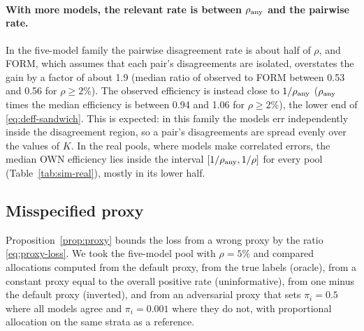 \paragraph{With more models, the relevant rate is between $\rho_{\rm any}$ and the pairwise rate.} In
the five-model family the pairwise disagreement rate is about half of $\rho$, and FORM, which assumes
that each pair's disagreements are isolated, overstates the gain by a factor of about 1.9 (median
ratio of observed to FORM between 0.53 and 0.56 for $\rho\ge2\%$). The observed efficiency is instead
close to $1/\rho_{\rm any}$ ($\rho_{\rm any}$ times the median efficiency is between 0.94 and 1.06 for
$\rho\ge2\%$), the lower end of \eqref{eq:deff-sandwich}. This is expected: in this family the models
err independently inside the disagreement region, so a pair's disagreements are spread evenly over
the values of $K$. In the real pools, where models make correlated errors, the median OWN efficiency
lies inside the interval $[1/\rho_{\rm any},1/\rho]$ for every pool (Table~\ref{tab:sim-real}),
mostly in its lower half.

\subsection{Misspecified proxy}\label{sec:sim-proxy}

Proposition~\ref{prop:proxy} bounds the loss from a wrong proxy by the ratio \eqref{eq:proxy-loss}.
We took the five-model pool with $\rho=5\%$ and compared allocations computed from the default proxy,
from the true labels (oracle), from a constant proxy equal to the overall positive rate
(uninformative), from one minus the default proxy (inverted), and from an adversarial proxy that sets
$\pi_i=0.5$ where all models agree and $\pi_i=0.001$ where they do not, with proportional allocation
on the same strata as a reference.

